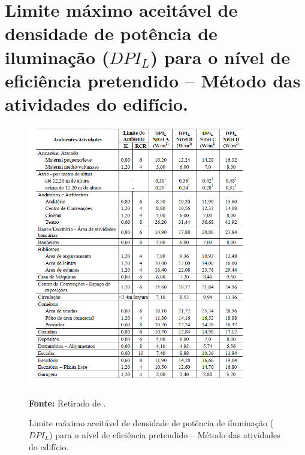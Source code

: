\documentclass[12pt, openright, oneside, a4paper, english, brazil]{abntex2}   %
\begin{document}

\anexos                    %
\chapter{Limite máximo aceitável de densidade de potência de iluminação ($DPI_L$) para o nível de eficiência pretendido – Método das atividades do edifício.}
\begin{figure}[H]
\centering
\includegraphics[width = 0.9\textwidth]{Figuras/tab1_1.PNG}
\caption{Limite máximo aceitável de densidade de potência de iluminação ($DPI_L$) para o nível de eficiência pretendido – Método das atividades do edifício.}
\label{tab2_1}
\textbf{Fonte:} Retirado de \cite{RTQ-C}.
\end{figure}
\end{document}
